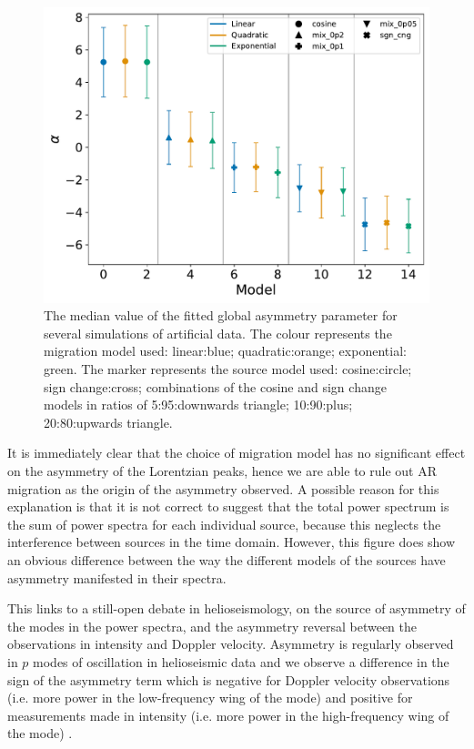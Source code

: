 \begin{figure}[ht!]
	\centering
	\includegraphics[width=0.85\columnwidth]{artificial_fit_asym.pdf}
	\caption{The median value of the fitted global asymmetry parameter for several simulations of artificial data. The colour represents the migration model used: linear:blue; quadratic:orange; exponential: green. The marker represents the source model used: cosine:circle; sign change:cross; combinations of the cosine and sign change models in ratios of 5:95:downwards triangle; 10:90:plus; 20:80:upwards triangle.}
	\label{fig:artificial_asymm}
\end{figure}

It is immediately clear that the choice of migration model has no significant effect on the asymmetry of the Lorentzian peaks, hence we are able to rule out AR migration as the origin of the asymmetry observed. A possible reason for this explanation is that it is not correct to suggest that the total power spectrum is the sum of power spectra for each individual source, because this neglects the interference between sources in the time domain. However, this figure does show an obvious difference between the way the different models of the sources have asymmetry manifested in their spectra.

This links to a still-open debate in helioseismology, on the source of asymmetry of the modes in the power spectra, and the asymmetry reversal between the observations in intensity and Doppler velocity. Asymmetry is regularly observed in $p$ modes of oscillation in helioseismic data and we observe a difference in the sign of the asymmetry term which is negative for Doppler velocity observations (i.e. more power in the low-frequency wing of the mode) and positive for measurements made in intensity (i.e. more power in the high-frequency wing of the mode) \citep{duvall_asymmetries_1993, chaplin_depth_1999, howe_validation_2015, basu_asteroseismic_2017}.

